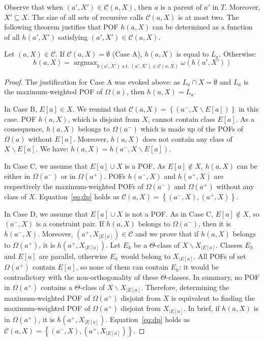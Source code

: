\documentclass[a4paper,UKenglish,numberwithinsect,cleveref, autoref,anonymous]{lipics-v2021}
\DeclareMathOperator*{\argmax}{argmax}
\newcommand{\set}[1]{\left\{ #1 \right\}}
\begin{document}
Observe that when $(a',X') \in \mathcal{C}(a,X)$, then $a$ is a parent of $a'$ in $T$. Moreover, $X' \subseteq X$. The size of all sets of recursive calls $\mathcal{C}(a,X)$ is at most two.
The following theorem justifies that POF $h(a,X)$ can be determined as a function of all $h(a',X')$ satisfying $(a',X') \in \mathcal{C}(a,X)$.

\begin{theorem}
Let $(a,X) \in \mathcal{C}$. If $\mathcal{C}(a,X) = \emptyset$ (Case A), $h(a,X)$ is equal to $L_a$. Otherwise:
\begin{equation}
h(a,X) = \argmax_{h(a',X') \mbox{~s.t.~} (a',X') \in \mathcal{C}(a,X)} \omega\left(h(a',X')\right)
\label{eq:dp}
\end{equation}
\label{th:dp_pairs}
\end{theorem}
\begin{proof}
The justification for Case A was evoked above: as $L_a \cap X = \emptyset$ and $L_a$ is the maximum-weighted POF of $\Omega(a)$, then $h(a,X) = L_a$.

In Case B, $E\left[a\right] \in X$. We remind that $\mathcal{C}(a,X) = \set{(a^-,X\backslash E\left[a\right])}$ in this case. POF $h(a,X)$, which is disjoint from $X$, cannot contain class $E\left[a\right]$. As a consequence, $h(a,X)$ belongs to $\Omega(a^-)$ which is made up of the POFs of $\Omega(a)$ without $E\left[a\right]$. Moreover, $h(a,X)$ does not contain any class of $X\backslash E\left[a\right]$. We have: $h(a,X) = h(a^-,X\backslash E\left[a\right])$.

In Case C, we assume that $E\left[a\right] \cup X$ is a POF. As $E\left[a\right] \notin X$, $h(a,X)$ can be either in $\Omega(a^-)$ or in $\Omega(a^+)$. POFs $h(a^-,X)$ and $h(a^+,X)$ are respectively the maximum-weighted POFs of $\Omega(a^-)$ and $\Omega(a^+)$ without any class of $X$. Equation~\eqref{eq:dp} holds as $\mathcal{C}(a,X) = \set{(a^-,X),(a^+,X)}$.

In Case D, we assume that $E\left[a\right] \cup X$ is not a POF. As in Case C, $E\left[a\right] \notin X$, so $(a^-,X)$ is a constraint pair. If $h(a,X)$ belongs to $\Omega(a^-)$, then it is $h(a^-,X)$. Moreover, $(a^+,X_{|E[a]})\in \mathcal{C}$ and we prove that if $h(a,X)$ belongs to $\Omega(a^+)$, it is $h(a^+,X_{|E[a]})$. Let $E_h$ be a $\Theta$-class of $X\backslash X_{|E[a]}$. Classes $E_h$ and $E\left[a\right]$ are parallel, otherwise $E_h$ would belong to $X_{|E[a]}$. All POFs of set $\Omega(a^+)$ contain $E\left[a\right]$, so none of them can contain $E_h$: it would be contradictory with the non-orthogonality of these $\Theta$-classes. In summary, no POF in $\Omega(a^+)$ contains a $\Theta$-class of $X\backslash X_{|E[a]}$. Therefore, determining the maximum-weighted POF of $\Omega(a^+)$ disjoint from $X$ is equivalent to finding the maximum-weighted POF  of $\Omega(a^+)$ disjoint from $X_{|E[a]}$. In brief, if $h(a,X)$ is in $\Omega(a^+)$, it is $h(a^+,X_{|E[a]})$. Equation~\eqref{eq:dp} holds as $\mathcal{C}(a,X) = \set{(a^-,X),(a^+,X_{|E[a]})}$.
\end{proof}
\end{document}
